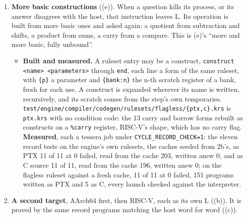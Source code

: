 \begin{enumerate}
\begin{itemize}
\begin{enumerate}
\begin{itemize}
\end{itemize}
\item \textbf{More basic constructions} ((e)). When a question kills its process, or its answer disagrees with the host, that instruction leaves L. Its operation is built from more basic ones and asked again: a quotient from subtraction and shifts, a product from sums, a carry from a compare. This is (e)'s “more and more basic, fully unbound”.

\begin{itemize}
\item \textbf{Built and measured.} A ruleset entry may be a construct, \texttt{construct <name> <parameters>} through \texttt{end}, each line a form of the same ruleset, with \texttt{\{p\}} a parameter and \texttt{\{bank:n\}} the n-th scratch register of a bank, fresh for each use. A construct is expanded wherever its name is written, recursively, and its scratch comes from the step's own temporaries. \texttt{test/\allowbreak{}engine/\allowbreak{}compiler/\allowbreak{}codegen/\allowbreak{}rulesets/\allowbreak{}flagless/\allowbreak{}\{ptx,c\}.\allowbreak{}krs} is \texttt{ptx.\allowbreak{}krs} with no condition code: the 13 carry and borrow forms rebuilt as constructs on a \texttt{\%carry} register, RISC-V's shape, which has no carry flag. \textbf{Measured}, each a tessera job under \texttt{CYCLE\_\allowbreak{}RECORD\_\allowbreak{}CHECK=1}: the eleven record tests on the engine's own rulesets, the caches seeded from 2b's, as PTX 11 of 11 at 0 failed, read from the cache 203, written anew 0, and as C source 11 of 11, read from the cache 196, written anew 0; on the flagless ruleset against a fresh cache, 11 of 11 at 0 failed, 151 programs written as PTX and 5 as C, every launch checked against the interpreter.
\end{itemize}
\item \textbf{A second target}, AArch64 first, then RISC-V, each as its own L ((b)). It is proved by the same record programs matching the host word for word ((c)).


\end{enumerate}
\end{itemize}
\end{enumerate}

